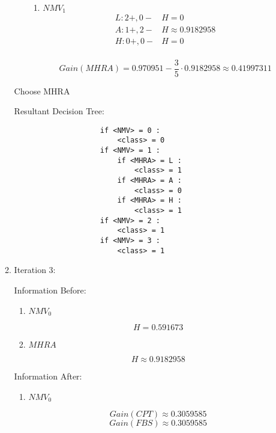 \begin{enumerate}
\begin{enumerate}
\begin{enumerate}
\begin{enumerate}
							\item{\(NMV_1\)}
							\[
								\begin{array}{l|l}
									L: 2+, 0- & H= 0 \\
									A: 1+, 2- & H \approx 0.9182958 \\
									H: 0+, 0- & H= 0 \\
								\end{array}
							\] 
							
							\[
								Gain(MHRA) = 0.970951 - \frac{3}{5} \cdot 0.9182958 \approx 0.41997311
							\]
							
						\end{enumerate}
					
				\end{enumerate}
				
				Choose MHRA
				
				Resultant Decision Tree:
			
				\begin{lstlisting}
					if <NMV> = 0 :
						<class> = 0
					if <NMV> = 1 :
						if <MHRA> = L :
							<class> = 1
						if <MHRA> = A :
							<class> = 0
						if <MHRA> = H :
							<class> = 1
					if <NMV> = 2 :
						<class> = 1
					if <NMV> = 3 :
						<class> = 1
				\end{lstlisting}
				
			\item{Iteration 3:}
			
				Information Before:
				
					\begin{enumerate}
					
						\item{\(NMV_0\)}
						
							\[
								H = 0.591673
							\]
							
						\item{ \(MHRA\) }
						
							\[
								H \approx 0.9182958
							\]
							
					\end{enumerate}
				
				Information After:
				
					\begin{enumerate}
					
						\item{\(NMV_0\)}
						
							\[
								Gain(CPT) \approx 0.3059585
							\]			
							\[
								Gain(FBS) \approx 0.3059585
							\]
							

\end{enumerate}
\end{enumerate}
\end{enumerate}
